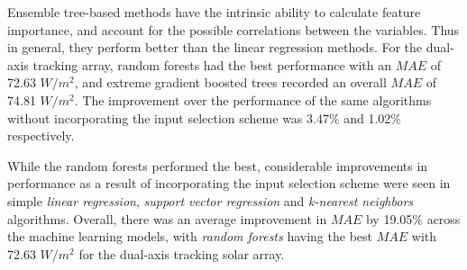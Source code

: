 \par Ensemble tree-based methods have the intrinsic ability to calculate feature importance, and account for the possible correlations between the variables. Thus in general, they perform better than the linear regression methods. For the dual-axis tracking array, random forests had the best performance with an $MAE$ of 72.63 $W/m^2$, and extreme gradient boosted trees recorded an overall $MAE$ of 74.81 $W/m^2$. The improvement over the performance of the same algorithms without incorporating the input selection scheme was 3.47\% and 1.02\% respectively.

\par While the random forests performed the best, considerable improvements in performance as a result of incorporating the input selection scheme were seen in simple \textit{linear regression}, \textit{support vector regression} and \textit{k-nearest neighbors} algorithms. Overall, there was an average improvement in $MAE$ by 19.05\% across the machine learning models, with \textit{random forests} having the best $MAE$ with 72.63 $W/m^2$ for the dual-axis tracking solar array.

